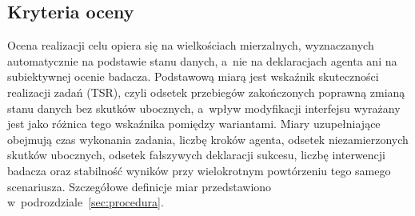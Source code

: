 \subsection*{Kryteria oceny}
Ocena realizacji celu opiera się na wielkościach mierzalnych, wyznaczanych automatycznie na podstawie stanu danych, a~nie na deklaracjach agenta ani na subiektywnej ocenie badacza. Podstawową miarą jest wskaźnik skuteczności realizacji zadań (TSR), czyli odsetek przebiegów zakończonych poprawną zmianą stanu danych bez skutków ubocznych, a~wpływ modyfikacji interfejsu wyrażany jest jako różnica tego wskaźnika pomiędzy wariantami. Miary uzupełniające obejmują czas wykonania zadania, liczbę kroków agenta, odsetek niezamierzonych skutków ubocznych, odsetek fałszywych deklaracji sukcesu, liczbę interwencji badacza oraz stabilność wyników przy wielokrotnym powtórzeniu tego samego scenariusza. Szczegółowe definicje miar przedstawiono w~podrozdziale~\ref{sec:procedura}.

